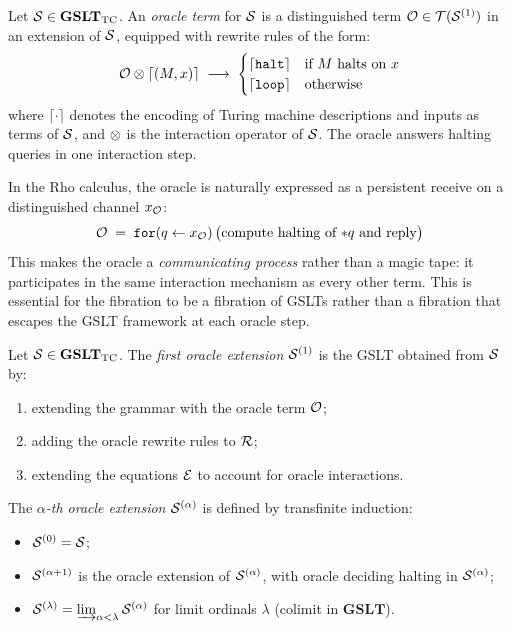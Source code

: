 \begin{definition}
Let $\mathcal{S} \in \mathbf{GSLT}_{\mathrm{TC}}$.
An \emph{oracle term} for $\mathcal{S}$ is a distinguished term
$\mathcal{O} \in \mathcal{T}(\mathcal{S}^{(1)})$ in an extension of $\mathcal{S}$,
equipped with rewrite rules of the form:
\[
  \mathcal{O} \otimes \lceil (M, x) \rceil \;\longrightarrow\;
  \begin{cases}
    \lceil \mathtt{halt} \rceil & \text{if } M \text{ halts on } x \\
    \lceil \mathtt{loop} \rceil & \text{otherwise}
  \end{cases}
\]
where $\lceil \cdot \rceil$ denotes the encoding of Turing machine
descriptions and inputs as terms of $\mathcal{S}$, and $\otimes$ is the
interaction operator of $\mathcal{S}$.
The oracle answers halting queries in one interaction step.
\end{definition}

\begin{remark}
In the Rho calculus, the oracle is naturally expressed as a
persistent receive on a distinguished channel $x_{\mathcal{O}}$:
\[
  \mathcal{O} \;=\; \mathtt{for}(q \leftarrow x_{\mathcal{O}})\,
  \bigl( \text{compute halting of } {*}q \text{ and reply} \bigr)
\]
This makes the oracle a \emph{communicating process} rather than
a magic tape: it participates in the same interaction mechanism as
every other term.
This is essential for the fibration to be a fibration of GSLTs
rather than a fibration that escapes the GSLT framework at each
oracle step.
\end{remark}

\begin{definition}
\label{def:oracle-ext}
Let $\mathcal{S} \in \mathbf{GSLT}_{\mathrm{TC}}$.
The \emph{first oracle extension} $\mathcal{S}^{(1)}$ is the GSLT obtained
from $\mathcal{S}$ by:
\begin{enumerate}[label=(\roman*)]
  \item extending the grammar with the oracle term $\mathcal{O}$;
  \item adding the oracle rewrite rules to $\mathcal{R}$;
  \item extending the equations $\mathcal{E}$ to account for oracle
        interactions.
\end{enumerate}
The \emph{$\alpha$-th oracle extension} $\mathcal{S}^{(\alpha)}$ is defined
by transfinite induction:
\begin{itemize}[itemsep=2pt]
  \item $\mathcal{S}^{(0)} = \mathcal{S}$;
  \item $\mathcal{S}^{(\alpha+1)}$ is the oracle extension of $\mathcal{S}^{(\alpha)}$,
        with oracle deciding halting in $\mathcal{S}^{(\alpha)}$;
  \item $\mathcal{S}^{(\lambda)} = \varinjlim_{\alpha < \lambda} \mathcal{S}^{(\alpha)}$
        for limit ordinals $\lambda$ (colimit in $\mathbf{GSLT}$).
\end{itemize}
\end{definition}

